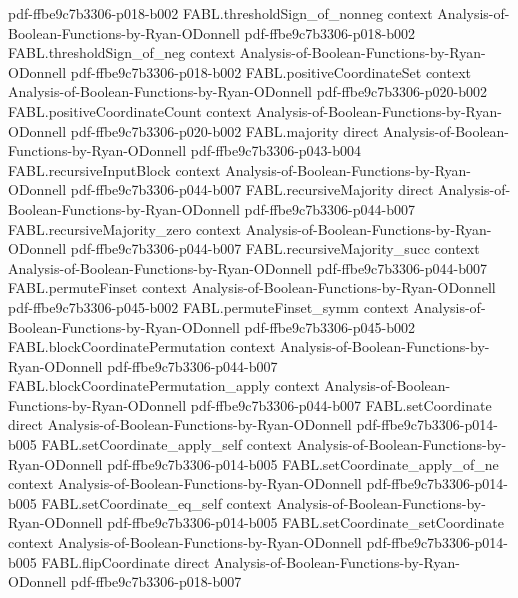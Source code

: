\begin{theorem}
  {pdf-ffbe9c7b3306-p018-b002}
\proofstep
  {FABL.thresholdSign_of_nonneg}
  {context}
  {Analysis-of-Boolean-Functions-by-Ryan-ODonnell}
  {pdf-ffbe9c7b3306-p018-b002}
\proofstep
  {FABL.thresholdSign_of_neg}
  {context}
  {Analysis-of-Boolean-Functions-by-Ryan-ODonnell}
  {pdf-ffbe9c7b3306-p018-b002}
\proofstep
  {FABL.positiveCoordinateSet}
  {context}
  {Analysis-of-Boolean-Functions-by-Ryan-ODonnell}
  {pdf-ffbe9c7b3306-p020-b002}
\proofstep
  {FABL.positiveCoordinateCount}
  {context}
  {Analysis-of-Boolean-Functions-by-Ryan-ODonnell}
  {pdf-ffbe9c7b3306-p020-b002}
\proofstep
  {FABL.majority}
  {direct}
  {Analysis-of-Boolean-Functions-by-Ryan-ODonnell}
  {pdf-ffbe9c7b3306-p043-b004}
\proofstep
  {FABL.recursiveInputBlock}
  {context}
  {Analysis-of-Boolean-Functions-by-Ryan-ODonnell}
  {pdf-ffbe9c7b3306-p044-b007}
\proofstep
  {FABL.recursiveMajority}
  {direct}
  {Analysis-of-Boolean-Functions-by-Ryan-ODonnell}
  {pdf-ffbe9c7b3306-p044-b007}
\proofstep
  {FABL.recursiveMajority_zero}
  {context}
  {Analysis-of-Boolean-Functions-by-Ryan-ODonnell}
  {pdf-ffbe9c7b3306-p044-b007}
\proofstep
  {FABL.recursiveMajority_succ}
  {context}
  {Analysis-of-Boolean-Functions-by-Ryan-ODonnell}
  {pdf-ffbe9c7b3306-p044-b007}
\proofstep
  {FABL.permuteFinset}
  {context}
  {Analysis-of-Boolean-Functions-by-Ryan-ODonnell}
  {pdf-ffbe9c7b3306-p045-b002}
\proofstep
  {FABL.permuteFinset_symm}
  {context}
  {Analysis-of-Boolean-Functions-by-Ryan-ODonnell}
  {pdf-ffbe9c7b3306-p045-b002}
\proofstep
  {FABL.blockCoordinatePermutation}
  {context}
  {Analysis-of-Boolean-Functions-by-Ryan-ODonnell}
  {pdf-ffbe9c7b3306-p044-b007}
\proofstep
  {FABL.blockCoordinatePermutation_apply}
  {context}
  {Analysis-of-Boolean-Functions-by-Ryan-ODonnell}
  {pdf-ffbe9c7b3306-p044-b007}
\proofstep
  {FABL.setCoordinate}
  {direct}
  {Analysis-of-Boolean-Functions-by-Ryan-ODonnell}
  {pdf-ffbe9c7b3306-p014-b005}
\proofstep
  {FABL.setCoordinate_apply_self}
  {context}
  {Analysis-of-Boolean-Functions-by-Ryan-ODonnell}
  {pdf-ffbe9c7b3306-p014-b005}
\proofstep
  {FABL.setCoordinate_apply_of_ne}
  {context}
  {Analysis-of-Boolean-Functions-by-Ryan-ODonnell}
  {pdf-ffbe9c7b3306-p014-b005}
\proofstep
  {FABL.setCoordinate_eq_self}
  {context}
  {Analysis-of-Boolean-Functions-by-Ryan-ODonnell}
  {pdf-ffbe9c7b3306-p014-b005}
\proofstep
  {FABL.setCoordinate_setCoordinate}
  {context}
  {Analysis-of-Boolean-Functions-by-Ryan-ODonnell}
  {pdf-ffbe9c7b3306-p014-b005}
\proofstep
  {FABL.flipCoordinate}
  {direct}
  {Analysis-of-Boolean-Functions-by-Ryan-ODonnell}
  {pdf-ffbe9c7b3306-p018-b007}

\end{theorem}
